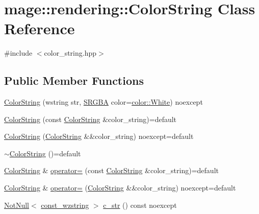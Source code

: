 \hypertarget{classmage_1_1rendering_1_1_color_string}{}\section{mage\+:\+:rendering\+:\+:Color\+String Class Reference}
\label{classmage_1_1rendering_1_1_color_string}


{\ttfamily \#include $<$color\+\_\+string.\+hpp$>$}

\subsection*{Public Member Functions}
\begin{DoxyCompactItemize}
\item 
\hyperlink{classmage_1_1rendering_1_1_color_string_a380bcff4ce39fa09e68626b7aeb975b2}{Color\+String} (wstring str, \hyperlink{structmage_1_1_s_r_g_b_a}{S\+R\+G\+BA} color=\hyperlink{namespacemage_1_1color_aecd3f854835fd8ac76f38a369ea539ed}{color\+::\+White}) noexcept
\item 
\hyperlink{classmage_1_1rendering_1_1_color_string_a386454b4a8e08707e8ffff8451509de5}{Color\+String} (const \hyperlink{classmage_1_1rendering_1_1_color_string}{Color\+String} \&color\+\_\+string)=default
\item 
\hyperlink{classmage_1_1rendering_1_1_color_string_a642793608186e9ac9931827ae9f0c57a}{Color\+String} (\hyperlink{classmage_1_1rendering_1_1_color_string}{Color\+String} \&\&color\+\_\+string) noexcept=default
\item 
\hyperlink{classmage_1_1rendering_1_1_color_string_a13ab2218e1cbe99241283214e455f3c9}{$\sim$\+Color\+String} ()=default
\item 
\hyperlink{classmage_1_1rendering_1_1_color_string}{Color\+String} \& \hyperlink{classmage_1_1rendering_1_1_color_string_ab42304d36628f21263a4d545831b3829}{operator=} (const \hyperlink{classmage_1_1rendering_1_1_color_string}{Color\+String} \&color\+\_\+string)=default
\item 
\hyperlink{classmage_1_1rendering_1_1_color_string}{Color\+String} \& \hyperlink{classmage_1_1rendering_1_1_color_string_aa70b60e0c8528306e7473ee0b5bfbe03}{operator=} (\hyperlink{classmage_1_1rendering_1_1_color_string}{Color\+String} \&\&color\+\_\+string) noexcept=default
\item 
\hyperlink{namespacemage_a8769f9d670d6b585ea306cb1062af94b}{Not\+Null}$<$ \hyperlink{namespacemage_ac409e0f2a22292a3a4cd42742994fbf0}{const\+\_\+wzstring} $>$ \hyperlink{classmage_1_1rendering_1_1_color_string_a2706724097d2ad5c187d34db49d86bda}{c\+\_\+str} () const noexcept

\end{DoxyCompactItemize}
